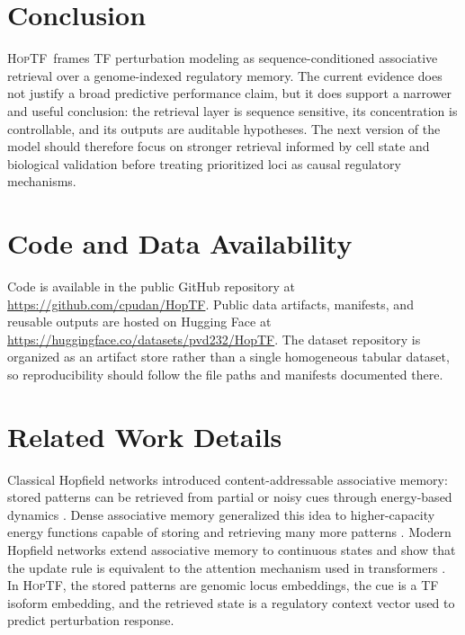 \documentclass{article}
\newcommand{\hoptf}{\textsc{HopTF}}
\begin{document}
\section{Conclusion}

\hoptf\ frames TF perturbation modeling as sequence-conditioned associative retrieval over a genome-indexed regulatory memory. The current evidence does not justify a broad predictive performance claim, but it does support a narrower and useful conclusion: the retrieval layer is sequence sensitive, its concentration is controllable, and its outputs are auditable hypotheses. The next version of the model should therefore focus on stronger retrieval informed by cell state and biological validation before treating prioritized loci as causal regulatory mechanisms.

\section{Code and Data Availability}

Code is available in the public GitHub repository at \url{https://github.com/cpudan/HopTF}. Public data artifacts, manifests, and reusable outputs are hosted on Hugging Face at \url{https://huggingface.co/datasets/pvd232/HopTF}. The dataset repository is organized as an artifact store rather than a single homogeneous tabular dataset, so reproducibility should follow the file paths and manifests documented there.




\newpage
\appendix
\onecolumn

\section{Related Work Details}
\label{app:related_work}

Classical Hopfield networks introduced content-addressable associative memory: stored patterns can be retrieved from partial or noisy cues through energy-based dynamics \citep{hopfield1982}. Dense associative memory generalized this idea to higher-capacity energy functions capable of storing and retrieving many more patterns \citep{krotov2016}. Modern Hopfield networks extend associative memory to continuous states and show that the update rule is equivalent to the attention mechanism used in transformers \citep{ramsauer2021,vaswani2017}. In \hoptf, the stored patterns are genomic locus embeddings, the cue is a TF isoform embedding, and the retrieved state is a regulatory context vector used to predict perturbation response.
\end{document}

